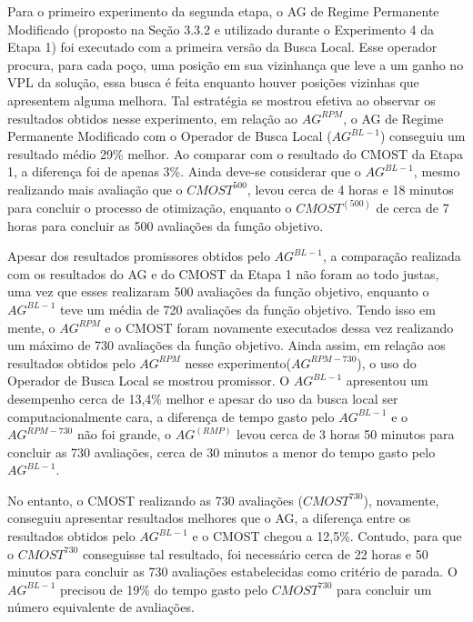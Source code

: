 Para o primeiro experimento da segunda etapa, o AG de Regime Permanente Modificado (proposto na Seção  3.3.2 e utilizado durante o Experimento 4 da Etapa 1) foi executado com a primeira versão da Busca Local. Esse operador procura, para cada poço, uma posição em sua vizinhança que leve a um ganho no VPL da solução, essa busca é feita enquanto houver posições vizinhas que apresentem alguma melhora. Tal estratégia se mostrou efetiva ao observar os resultados obtidos nesse experimento, em relação ao $AG^{RPM}$, o AG de Regime Permanente Modificado com o Operador de Busca Local ($AG^{BL-1}$) conseguiu um resultado médio 29\% melhor. Ao comparar com o resultado do CMOST da Etapa 1, a diferença foi de apenas 3\%. Ainda deve-se considerar que o $AG^{BL-1}$, mesmo realizando mais avaliação que o $CMOST^{500}$, levou cerca de 4 horas e 18 minutos para concluir o processo de otimização, enquanto o $CMOST^(500)$ de cerca de 7 horas para concluir as 500 avaliações da função objetivo.

Apesar dos resultados promissores obtidos pelo $AG^{BL-1}$, a comparação realizada com os resultados do AG e do CMOST da Etapa 1 não foram ao todo justas, uma vez que esses realizaram 500 avaliações da função objetivo, enquanto o $AG^{BL-1}$ teve um média de 720 avaliações da função objetivo. Tendo isso em mente, o $AG^{RPM}$ e o CMOST foram novamente executados dessa vez realizando um máximo de 730 avaliações da função objetivo. Ainda assim, em relação aos resultados obtidos pelo $AG^{RPM}$ nesse experimento($AG^{RPM-730}$), o uso do Operador de Busca Local se mostrou promissor. O $AG^{BL-1}$ apresentou um desempenho cerca de 13,4\% melhor e apesar do uso da busca local ser computacionalmente cara, a diferença de tempo gasto pelo $AG^{BL-1}$ e o $AG^{RPM-730}$ não foi grande, o $AG^(RMP)$ levou cerca de 3 horas 50 minutos para concluir as 730 avaliações, cerca de 30 minutos a menor do tempo gasto pelo $AG^{BL-1}$.

No entanto, o CMOST realizando as 730 avaliações ($CMOST^{730}$), novamente, conseguiu apresentar resultados melhores que o AG, a diferença entre os resultados obtidos pelo $AG^{BL-1}$ e o CMOST chegou a 12,5\%. Contudo, para que o $CMOST^{730}$ conseguisse tal resultado, foi necessário cerca de 22 horas e 50 minutos para concluir as 730 avaliações estabelecidas como critério de parada. O $AG^{BL-1}$ precisou de 19\% do tempo gasto pelo $CMOST^{730}$ para concluir um número equivalente de avaliações.

